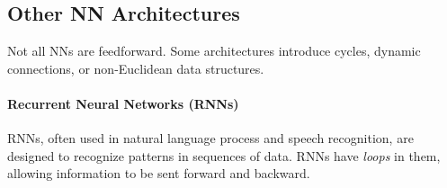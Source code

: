 \documentclass[oneside,11pt,dvipsnames]{book}
\numberwithin{equation}{section}
\theoremstyle{definition}
\theoremstyle{remark}
\begin{document}



\subsection{Other NN Architectures}

Not all NNs are feedforward. Some architectures introduce cycles, dynamic connections, or non-Euclidean data structures.

\paragraph{Recurrent Neural Networks (RNNs)} RNNs, often used in natural language process and speech recognition, are designed to recognize patterns in sequences of data. RNNs have \emph{loops} in them, allowing information to be sent forward and backward.
\end{document}
